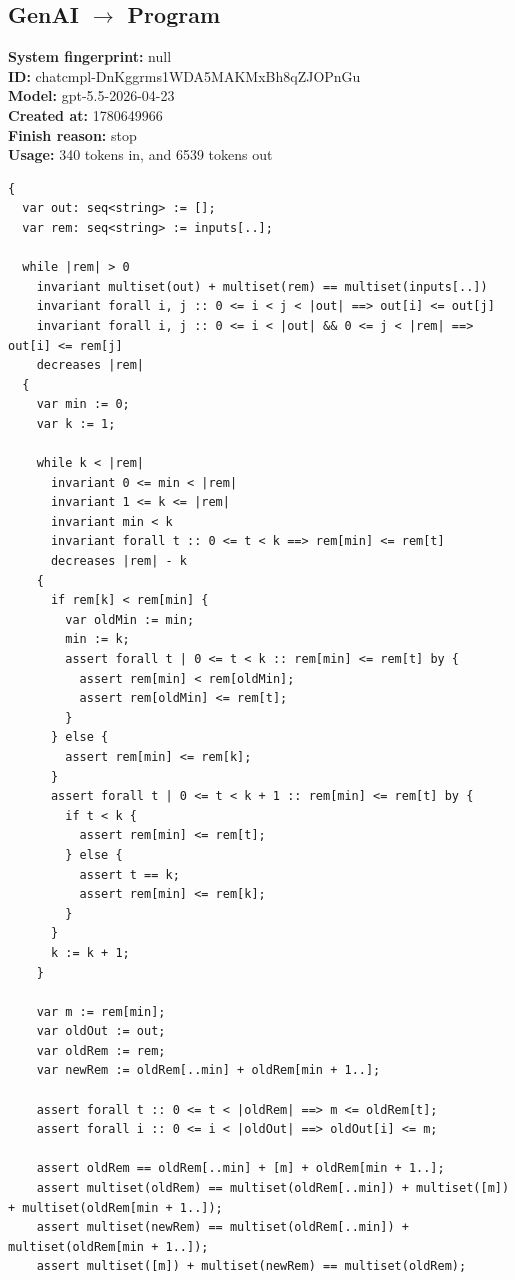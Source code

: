 \documentclass{article}
\begin{document}
\subsection*{GenAI $\rightarrow$ Program}
\textbf{System fingerprint: }null
\\\textbf{ID: }chatcmpl-DnKggrms1WDA5MAKMxBh8qZJOPnGu
\\\textbf{Model: }gpt-5.5-2026-04-23
\\\textbf{Created at: }1780649966
\\\textbf{Finish reason: }stop
\\\textbf{Usage: }340 tokens in, and 6539 tokens out
\begin{lstlisting}
{
  var out: seq<string> := [];
  var rem: seq<string> := inputs[..];

  while |rem| > 0
    invariant multiset(out) + multiset(rem) == multiset(inputs[..])
    invariant forall i, j :: 0 <= i < j < |out| ==> out[i] <= out[j]
    invariant forall i, j :: 0 <= i < |out| && 0 <= j < |rem| ==> out[i] <= rem[j]
    decreases |rem|
  {
    var min := 0;
    var k := 1;

    while k < |rem|
      invariant 0 <= min < |rem|
      invariant 1 <= k <= |rem|
      invariant min < k
      invariant forall t :: 0 <= t < k ==> rem[min] <= rem[t]
      decreases |rem| - k
    {
      if rem[k] < rem[min] {
        var oldMin := min;
        min := k;
        assert forall t | 0 <= t < k :: rem[min] <= rem[t] by {
          assert rem[min] < rem[oldMin];
          assert rem[oldMin] <= rem[t];
        }
      } else {
        assert rem[min] <= rem[k];
      }
      assert forall t | 0 <= t < k + 1 :: rem[min] <= rem[t] by {
        if t < k {
          assert rem[min] <= rem[t];
        } else {
          assert t == k;
          assert rem[min] <= rem[k];
        }
      }
      k := k + 1;
    }

    var m := rem[min];
    var oldOut := out;
    var oldRem := rem;
    var newRem := oldRem[..min] + oldRem[min + 1..];

    assert forall t :: 0 <= t < |oldRem| ==> m <= oldRem[t];
    assert forall i :: 0 <= i < |oldOut| ==> oldOut[i] <= m;

    assert oldRem == oldRem[..min] + [m] + oldRem[min + 1..];
    assert multiset(oldRem) == multiset(oldRem[..min]) + multiset([m]) + multiset(oldRem[min + 1..]);
    assert multiset(newRem) == multiset(oldRem[..min]) + multiset(oldRem[min + 1..]);
    assert multiset([m]) + multiset(newRem) == multiset(oldRem);


\end{lstlisting}
\end{document}
